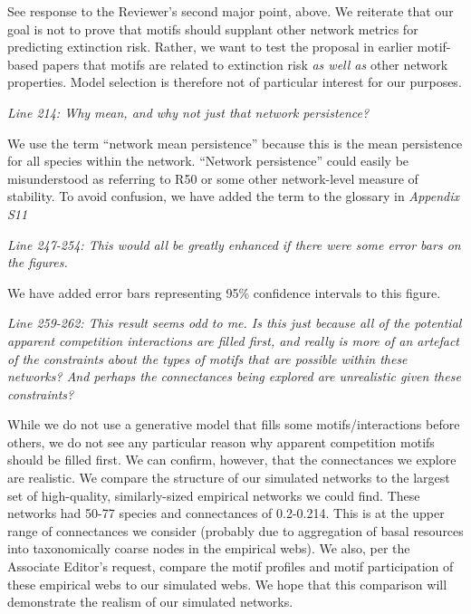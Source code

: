 \documentclass[12pt]{article}
\newcommand{\us}{\rm \setlength{\leftskip}{0.3cm} \setlength{\rightskip}{0.3cm}}
\newcommand{\them}{\it \setlength{\leftskip}{0cm} \setlength{\rightskip}{0cm}}
\begin{document}
        \us See response to the Reviewer's second major point, above. We reiterate that our goal is not to prove that motifs should supplant other network metrics for predicting extinction risk. Rather, we want to test the proposal in earlier motif-based papers that motifs are related to extinction risk \emph{as well as} other network properties. Model selection is therefore not of particular interest for our purposes.
        
        \them
        Line 214: Why mean, and why not just that network persistence?
        
        \us We use the term ``network mean persistence'' because this is the mean persistence for all species within the network. ``Network persistence'' could easily be misunderstood as referring to R50 or some other network-level measure of stability. To avoid confusion, we have added the term to the glossary in \emph{Appendix S11}
        
        
        \them
        Line 247-254: This would all be greatly enhanced if there were some error bars on the figures.
        
        \us We have added error bars representing 95\% confidence intervals to this figure.
        
        \them
        Line 259-262: This result seems odd to me. Is this just because all of the potential apparent competition interactions are filled first, and really is more of an artefact of the constraints about the types of motifs that are possible within these networks? And perhaps the connectances being explored are unrealistic given these constraints?
        
        \us While we do not use a generative model that fills some motifs/interactions before others, we do not see any particular reason why apparent competition motifs should be filled first. We can confirm, however, that the connectances we explore are realistic. We compare the structure of our simulated networks to the largest set of high-quality, similarly-sized empirical networks we could find. These networks had 50-77 species and connectances of 0.2-0.214. This is at the upper range of connectances we consider (probably due to aggregation of basal resources into taxonomically coarse nodes in the empirical webs). We also, per the Associate Editor's request, compare the motif profiles and motif participation of these empirical webs to our simulated webs. We hope that this comparison will demonstrate the realism of our simulated networks.
        
\end{document}
